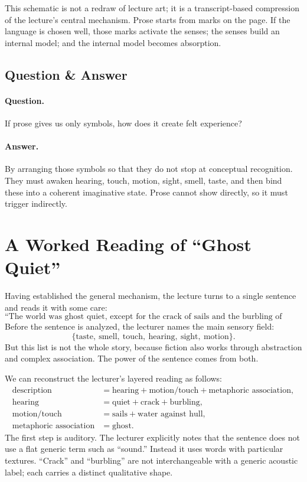 This schematic is not a redraw of lecture art; it is a transcript-based compression of the lecture's central mechanism. Prose starts from marks on the page. If the language is chosen well, those marks activate the senses; the senses build an internal model; and the internal model becomes absorption.

\subsection{Question \& Answer}

\paragraph{Question.} If prose gives us only symbols, how does it create felt experience?

\paragraph{Answer.} By arranging those symbols so that they do not stop at conceptual recognition. They must awaken hearing, touch, motion, sight, smell, taste, and then bind these into a coherent imaginative state. Prose cannot show directly, so it must trigger indirectly.

\section{A Worked Reading of ``Ghost Quiet''}

Having established the general mechanism, the lecture turns to a single sentence and reads it with some care:
\[
\text{``The world was ghost quiet, except for the crack of sails and the burbling of water against hull.''}
\]
Before the sentence is analyzed, the lecturer names the main sensory field:
\begin{equation}
\{\text{taste},\ \text{smell},\ \text{touch},\ \text{hearing},\ \text{sight},\ \text{motion}\}.
\end{equation}
But this list is not the whole story, because fiction also works through abstraction and complex association. The power of the sentence comes from both.

We can reconstruct the lecturer's layered reading as follows:
\begin{align}
\text{description} &= \text{hearing} + \text{motion/touch} + \text{metaphoric association},\\
\text{hearing} &= \text{quiet} + \text{crack} + \text{burbling},\\
\text{motion/touch} &= \text{sails} + \text{water against hull},\\
\text{metaphoric association} &= \text{ghost}.
\end{align}
The first step is auditory. The lecturer explicitly notes that the sentence does not use a flat generic term such as ``sound.'' Instead it uses words with particular textures. ``Crack'' and ``burbling'' are not interchangeable with a generic acoustic label; each carries a distinct qualitative shape.


